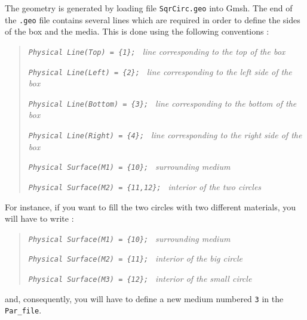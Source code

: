 The geometry is generated by loading file \texttt{SqrCirc.geo} into
Gmsh. The end of the \texttt{.geo} file contains several lines which
are required in order to define the sides of the box and the media.
This is done using the following conventions :
%
\begin{quote}
\texttt{\textit{Physical Line(\textquotedbl Top\textquotedbl)
= \{1\}; }}
\textsf{\textit{\small line corresponding to the top of the box}}

\texttt{\textit{Physical Line(\textquotedbl Left\textquotedbl)
= \{2\}; }}
\textsf{\textit{\small line corresponding to the left side of the box}}

\texttt{\textit{Physical Line(\textquotedbl Bottom\textquotedbl)
= \{3\}; }}
\textsf{\textit{\small line corresponding to the bottom of the box}}

\texttt{\textit{Physical Line(\textquotedbl Right\textquotedbl)
= \{4\}; }}
\textsf{\textit{\small line corresponding to the right side of the box}}

\texttt{\textit{Physical Surface(\textquotedbl M1\textquotedbl)
= \{10\}; }}
\textsf{\textit{\small surrounding medium}}

\texttt{\textit{Physical Surface(\textquotedbl M2\textquotedbl)
= \{11,12\}; }}
\textsf{\textit{\small interior of the two circles}}
\end{quote}
%
For instance, if you want to fill the two circles with two different
materials, you will have to write :
%
\begin{quote}
\texttt{\textit{Physical Surface(\textquotedbl M1\textquotedbl)
= \{10\}; }}
\textsf{\textit{\small surrounding medium}}

\texttt{\textit{Physical Surface(\textquotedbl M2\textquotedbl)
= \{11\}; }}
\textsf{\textit{\small interior of the big circle}}

\texttt{\textit{Physical Surface(\textquotedbl M3\textquotedbl)
= \{12\}; }}
\textsf{\textit{\small interior of the small circle}}
\end{quote}
%
and, consequently, you will have to define a new medium numbered \texttt{3}
in the \texttt{Par\_file}.

